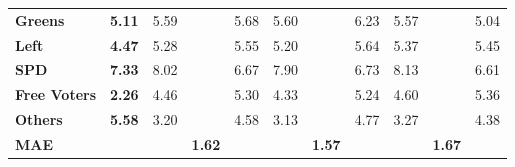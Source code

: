 \begin{table}[h!]
{\begin{minipage}{2\linewidth}
\begin{tabular*}{\linewidth}{@{\extracolsep{\fill}}lrrrrrrrrrr}
{\bfseries Greens} & \multicolumn{1}{c}{{\bfseries 5.11}} & \multicolumn{1}{c}{{5.59}} & \multicolumn{1}{c}{{\cellcolor[HTML]{F8F8F8}{\textcolor[HTML]{000000}{0.48}}}} & \multicolumn{1}{c}{{5.68}} & \multicolumn{1}{c}{{5.60}} & \multicolumn{1}{c}{{\cellcolor[HTML]{F8F8F8}{\textcolor[HTML]{000000}{0.49}}}} & \multicolumn{1}{c}{{6.23}} & \multicolumn{1}{c}{{5.57}} & \multicolumn{1}{c}{{\cellcolor[HTML]{F9F9F9}{\textcolor[HTML]{000000}{0.46}}}} & \multicolumn{1}{c}{{5.04}} \\ 
{\bfseries Left} & \multicolumn{1}{c}{{\bfseries 4.47}} & \multicolumn{1}{c}{{5.28}} & \multicolumn{1}{c}{{\cellcolor[HTML]{F4F4F4}{\textcolor[HTML]{000000}{0.82}}}} & \multicolumn{1}{c}{{5.55}} & \multicolumn{1}{c}{{5.20}} & \multicolumn{1}{c}{{\cellcolor[HTML]{F5F5F5}{\textcolor[HTML]{000000}{0.73}}}} & \multicolumn{1}{c}{{5.64}} & \multicolumn{1}{c}{{5.37}} & \multicolumn{1}{c}{{\cellcolor[HTML]{F2F2F2}{\textcolor[HTML]{000000}{0.90}}}} & \multicolumn{1}{c}{{5.45}} \\ 
{\bfseries SPD} & \multicolumn{1}{c}{{\bfseries 7.33}} & \multicolumn{1}{c}{{8.02}} & \multicolumn{1}{c}{{\cellcolor[HTML]{F5F5F5}{\textcolor[HTML]{000000}{0.69}}}} & \multicolumn{1}{c}{{6.67}} & \multicolumn{1}{c}{{7.90}} & \multicolumn{1}{c}{{\cellcolor[HTML]{F7F7F7}{\textcolor[HTML]{000000}{0.58}}}} & \multicolumn{1}{c}{{6.73}} & \multicolumn{1}{c}{{8.13}} & \multicolumn{1}{c}{{\cellcolor[HTML]{F4F4F4}{\textcolor[HTML]{000000}{0.80}}}} & \multicolumn{1}{c}{{6.61}} \\ 
{\bfseries Free Voters} & \multicolumn{1}{c}{{\bfseries 2.26}} & \multicolumn{1}{c}{{4.46}} & \multicolumn{1}{c}{{\cellcolor[HTML]{E1E1E1}{\textcolor[HTML]{000000}{2.20}}}} & \multicolumn{1}{c}{{5.30}} & \multicolumn{1}{c}{{4.33}} & \multicolumn{1}{c}{{\cellcolor[HTML]{E2E2E2}{\textcolor[HTML]{000000}{2.07}}}} & \multicolumn{1}{c}{{5.24}} & \multicolumn{1}{c}{{4.60}} & \multicolumn{1}{c}{{\cellcolor[HTML]{DFDFDF}{\textcolor[HTML]{000000}{2.34}}}} & \multicolumn{1}{c}{{5.36}} \\ 
{\bfseries Others} & \multicolumn{1}{c}{{\bfseries 5.58}} & \multicolumn{1}{c}{{3.20}} & \multicolumn{1}{c}{{\cellcolor[HTML]{C4C4C4}{\textcolor[HTML]{000000}{-2.39}}}} & \multicolumn{1}{c}{{4.58}} & \multicolumn{1}{c}{{3.13}} & \multicolumn{1}{c}{{\cellcolor[HTML]{C3C3C3}{\textcolor[HTML]{000000}{-2.46}}}} & \multicolumn{1}{c}{{4.77}} & \multicolumn{1}{c}{{3.27}} & \multicolumn{1}{c}{{\cellcolor[HTML]{C6C6C6}{\textcolor[HTML]{000000}{-2.31}}}} & \multicolumn{1}{c}{{4.38}} \\ 
{\bfseries MAE} & \multicolumn{1}{c}{{\bfseries }} & \multicolumn{1}{c}{{\bfseries }} & \multicolumn{1}{c}{{\bfseries 1.62}} & \multicolumn{1}{c}{{\bfseries }} & \multicolumn{1}{c}{{\bfseries }} & \multicolumn{1}{c}{{\bfseries 1.57}} & \multicolumn{1}{c}{{\bfseries }} & \multicolumn{1}{c}{{\bfseries }} & \multicolumn{1}{c}{{\bfseries 1.67}} & \multicolumn{1}{c}{{\bfseries }} \\ 

\end{tabular*}
\end{minipage}}
\end{table}
